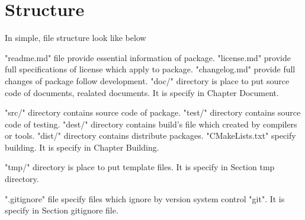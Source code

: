 \section{Structure}

\begin{crules}
\end{crules}

In simple, file structure look like below\\

"readme.md" file provide essential information of package. "license.md" provide
full specifications of license which apply to package. "changelog.md" provide
full changes of package follow development. "doc/" directory is place to put
source code of documents, realated documents.
It is specify in Chapter Document.

"src/" directory contains source code of package. "test/" directory contains
source code of testing. "dest/" directory contains build's file which
created by compilers or tools. "dist/" directory contains distribute packages.
"CMakeLists.txt" specify building. It is specify in Chapter Building.

"tmp/" directory is place to put template files. It is specify in Section
tmp directory.

".gitignore" file specify files which ignore by version system control "git".
It is specify in Section gitignore file.
